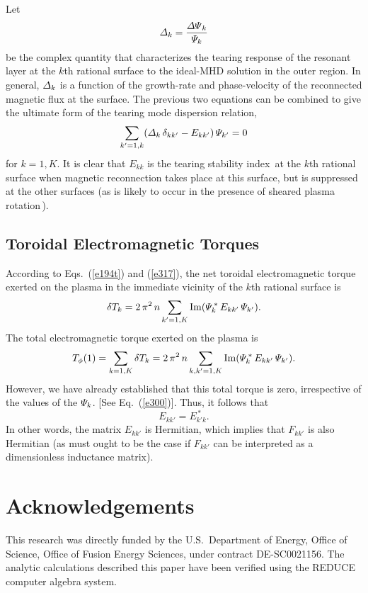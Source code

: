 \documentclass[12pt,prb,aps]{revtex4-1}
\begin{document}
Let
\begin{equation}
{\mit\Delta}_k = \frac{{\mit\Delta\Psi}_k}{{\mit\Psi}_k}
\end{equation}
 be the complex quantity that characterizes the
tearing response of the resonant layer at the $k$th rational surface to the ideal-MHD solution in the outer region.\cite{fkr}
In general, ${\mit\Delta}_k$ is a function of the growth-rate and phase-velocity of the reconnected magnetic flux at the surface.\cite{am1,layer,layer1}
The previous two equations can be combined to give the ultimate form of the tearing mode dispersion relation,
\begin{equation}
\sum_{k'=1,k}({\mit\Delta}_k\,\delta_{kk'}-E_{kk'})\,{\mit\Psi}_{k'} = 0
\end{equation}
for $k=1,K$. It is clear that $E_{kk}$ is the tearing stability index\,\cite{fkr} at the $k$th rational surface when magnetic reconnection  takes place
at this surface, but is suppressed at the other surfaces (as is likely to occur in the presence of sheared plasma rotation\,\cite{am1}). 

\subsection{Toroidal Electromagnetic Torques}
According to Eqs.~(\ref{e194t}) and (\ref{e317}), the net toroidal electromagnetic torque exerted on the plasma
in the immediate vicinity of the $k$th rational surface is
\begin{equation}
\delta T_k = 2\,\pi^2\,n\sum_{k'=1,K} {\rm Im}({\mit\Psi}_k^{\,\ast}\,E_{kk'}\,{\mit\Psi}_{k'}).
\end{equation}
The total electromagnetic torque exerted on the plasma is
\begin{equation}
T_\phi(1) = \sum_{k=1,K}\delta T_k =  2\,\pi^2\,n\sum_{k,k'=1,K} {\rm Im}({\mit\Psi}_k^{\,\ast}\,E_{kk'}\,{\mit\Psi}_{k'}).
\end{equation}
However, we have already established that this total torque is zero, irrespective of the values of the ${\mit\Psi}_k$. [See Eq.~(\ref{e300})].
Thus, it follows that
\begin{equation}
E_{kk'} = E_{k'k}^{\,\ast}.
\end{equation}
In other words, the matrix $E_{kk'}$ is Hermitian,\cite{am1} which implies that $F_{kk'}$ is also Hermitian (as must ought to be the case if $F_{kk'}$ can
be interpreted as 
a dimensionless inductance matrix). 

\section*{Acknowledgements}
This research was directly funded by the U.S.\ Department of Energy, Office of Science, Office of Fusion Energy Sciences, under  contract DE-SC0021156. 
The analytic calculations  described  this paper have been verified using the {\sc REDUCE} computer algebra system.
\end{document}
